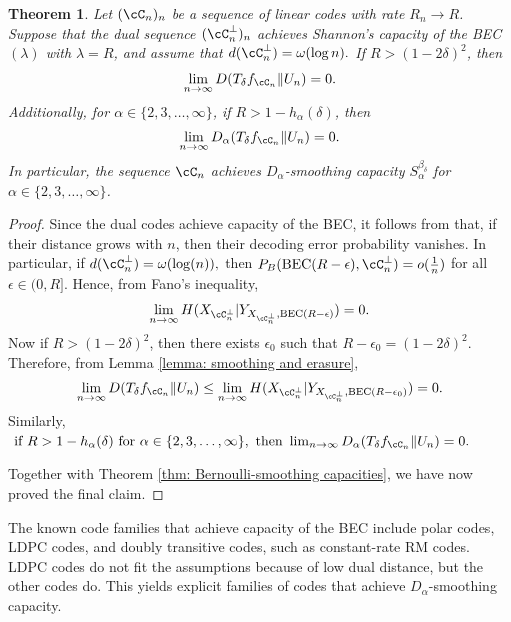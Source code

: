 \documentclass{amsart}
\newtheorem{theorem}{Theorem}[section]
\theoremstyle{remark}
\begin{document}
\begin{theorem}\label{thm: Bernoulli Smoothing - BEC capacity-achieving codes}
Let $(\cC_n)_n$ be a sequence of linear codes with rate $R_n\to R$. Suppose that
the dual sequence $(\cC_n^\bot)_n$ achieves Shannon's capacity of the BEC$(\lambda)$ with $\lambda=R$, and assume that $d(\cC_n^\bot) = \omega(\log n).$ If  $R> (1-2\delta)^2$, then 
    \begin{align*}
        \lim_{n \to \infty}D(T_{\delta}f_{\cC_n}\|U_n) = 0. 
    \end{align*}
Additionally, for $\alpha \in \{2,3,\dots,\infty\}$, if $R>1-h_{\alpha} (\delta)$, then 
    \begin{align*}
       \lim_{n \to \infty} D_{\alpha}(T_{\delta}f_{\cC_n}\|U_n) = 0. 
    \end{align*}
    In particular, the sequence $\cC_n$ achieves $D_\alpha$-smoothing capacity $S_\alpha^{\beta_\delta}$ for $\alpha \in \{2,3,\dots,\infty\}$.
\end{theorem}
\begin{proof}
Since the dual codes achieve capacity of the BEC, it follows from \cite[Theorem~ 5.2]{tillich2000discrete} that, if their distance grows with $n$, then their decoding error probability vanishes. In particular,
if   $ d(\cC_n^\bot) = \omega(\log(n)),$ then 
$P_B({\text{\rm BEC}}(R-\epsilon),{\cC_n^{\bot}}) = o(\frac{1}{n})$ for all $\epsilon \in (0,R].$ Hence, from Fano's inequality, $$\lim_{n \to \infty} H(X_{\cC_n^{\bot}}|Y_{X_{\cC_n^{\bot}},{\text{\rm BEC}}(R-\epsilon)}) = 0.$$ 
Now if $R> (1-2\delta)^2$, then there exists $\epsilon_0$ such that $R-\epsilon_0 = (1-2\delta)^2$. Therefore, from Lemma \ref{lemma: smoothing and erasure},  
\begin{align*}
    \lim_{n \rightarrow \infty}D(T_{\delta}f_{\cC_n}\|U_n) \leq  \lim_{n \to \infty} H(X_{\cC_n^{\bot}}|Y_{X_{\cC_n^{\bot}},{\text{\rm BEC}}(R-\epsilon_0)}) = 0.
\end{align*}
Similarly, $\text{ if }  R> 1- h_{\alpha} (\delta) \text{ for } \alpha \in \{2,3,\dots,\infty\}, \text{ then } \lim_{n \rightarrow \infty} D_{\alpha}(T_{\delta}f_{\cC_n}\|U_n) = 0.$

Together with Theorem \ref{thm: Bernoulli-smoothing capacities}, we have now proved the final claim.
\end{proof}

The known code families that achieve capacity of the BEC include polar codes, LDPC codes, and doubly transitive codes, such as constant-rate RM codes. LDPC codes do not fit the assumptions because of low dual distance, but the other codes do. This yields explicit
families of codes that achieve $D_{\alpha}$-smoothing capacity.
\end{document}
